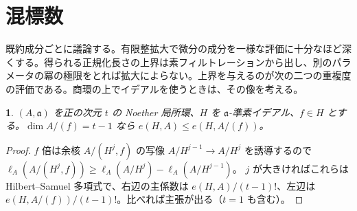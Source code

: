 \documentclass[11pt,a4paper]{ltjsarticle}
\newcommand{\stmtname}{}
\theoremstyle{plain}
\newtheorem*{stmtgen}{\stmtname}
\newenvironment{stmt}[1]{\renewcommand{\stmtname}{#1}\begin{stmtgen}}{\end{stmtgen}}
\theoremstyle{definition}
\begin{document}
\section{混標数}\label{sec:mixed}

既約成分ごとに議論する。有限整拡大で微分の成分を一様な評価に十分なほど深くする。得られる正規化長さの上界は素フィルトレーションから出し、別のパラメータの冪の極限をとれば拡大によらない。上界を与えるのが次の二つの重複度の評価である。商環の上でイデアルを使うときは、その像を考える。

\begin{stmt}{補題 6.1}
$(A,\mathfrak{a})$ を正の次元 $t$ の Noether 局所環、$H$ を $\mathfrak{a}$-準素イデアル、$f\in H$ とする。$\dim A/(f) = t-1$ なら $e(H,A)\le e(H,A/(f))$。
\end{stmt}
\begin{proof}
$f$ 倍は余核 $A/(H^j,f)$ の写像 $A/H^{j-1}\to A/H^j$ を誘導するので
$\ell_A(A/(H^j,f))\ge\ell_A(A/H^j)-\ell_A(A/H^{j-1})$。
$j$ が大きければこれらは Hilbert--Samuel 多項式で、右辺の主係数は $e(H,A)/(t-1)!$、左辺は $e(H,A/(f))/(t-1)!$。比べれば主張が出る（$t = 1$ も含む）。
\end{proof}
\end{document}
